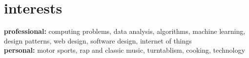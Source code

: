 \documentclass[]{friggeri-cv} %
\begin{document}
\begin{comment}
         C\quad{\color{red} $\varheartsuit\varheartsuit\varheartsuit\varheartsuit\varheartsuit\varheartsuit\varheartsuit\varheartsuit$}{\color{black} $\varheartsuit\varheartsuit\varheartsuit\varheartsuit\varheartsuit\varheartsuit\varheartsuit$} \\

         Latex\quad{\color{red} $\varheartsuit\varheartsuit\varheartsuit\varheartsuit\varheartsuit\varheartsuit\varheartsuit\varheartsuit\varheartsuit\varheartsuit\varheartsuit$}{\color{black} $\varheartsuit\varheartsuit\varheartsuit\varheartsuit$}

\end{comment}

\section{interests}

\textbf{professional:} computing problems, data analysis, algorithms, machine learning, design patterns, web design, software design, internet of things \\
\textbf{personal:} motor sports, rap and classic music, turntablism, cooking, technology
\end{document}
